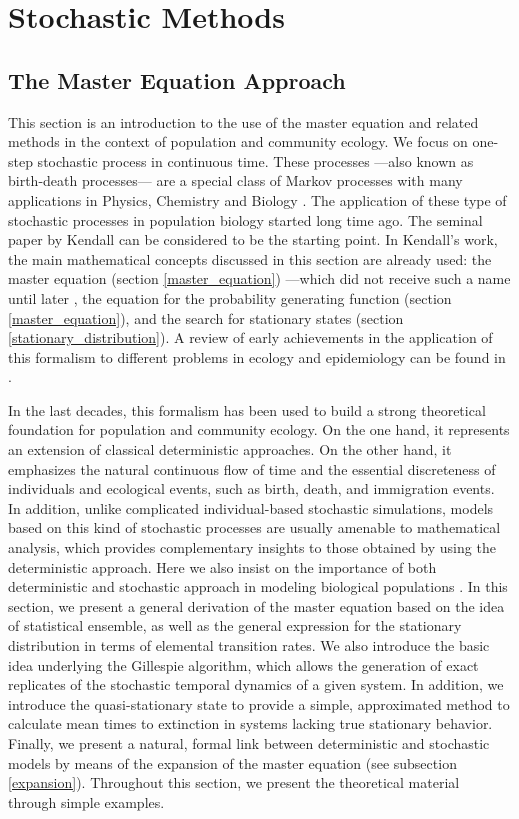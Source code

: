 
\section{Stochastic Methods}
\subsection{The Master Equation Approach}
This section is an introduction to the use of the master equation and related methods in the context of population and community ecology. We focus on one-step stochastic process in continuous time. These processes ---also known as birth-death processes--- are a special class of Markov processes with many applications in Physics, Chemistry and Biology \cite{vanKampen92}. The application of these type of stochastic processes in population biology started long time ago. The seminal paper by Kendall \cite{Kendall48} can be considered to be the starting point. In Kendall's work, the main mathematical concepts discussed in this section are already used: the master equation (section \ref{master_equation}) ---which did not receive such a name until later \cite{vanKampen92}, the equation for the probability generating function (section \ref{master_equation}), and the search for stationary states (section \ref{stationary_distribution}). A review of early achievements in the application of this formalism to different problems in ecology and epidemiology can be found in \cite{Barlett60}.
\smallskip

In the last decades, this formalism has been used to build a strong theoretical foundation for population and community ecology. On the one hand, it represents an extension of classical deterministic approaches. On the other hand, it emphasizes the natural continuous flow of time and the essential discreteness of individuals and ecological events, such as birth, death, and immigration events. In addition, unlike complicated individual-based stochastic simulations, models based on this kind of stochastic processes are usually amenable to mathematical analysis, which provides complementary insights to those obtained by using the deterministic approach. Here we also insist on the importance of both deterministic and stochastic approach in modeling biological populations \cite{Nisbet82,Renshaw91}. In this section, we present a general derivation of the master equation based on the idea of statistical ensemble, as well as the general expression for the stationary distribution in terms of elemental transition rates. We also introduce the basic idea underlying the Gillespie algorithm, which allows the generation of exact replicates of the stochastic temporal dynamics of a given system. In addition, we introduce the quasi-stationary state to provide a simple, approximated method to calculate mean times to extinction in systems lacking true stationary behavior. Finally, we present a natural, formal link between deterministic and stochastic models by means of the expansion of the master equation (see subsection \ref{expansion}). Throughout this section, we present the theoretical material through simple examples.

